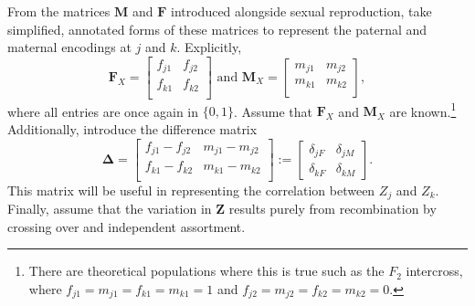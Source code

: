 \documentclass[sts]{imsart}
\newcommand{\ve}[1]{\mathbf{#1}}           %
\newcommand{\m}[1]{\mathbf{#1}}               %
\newcommand{\sm}[1]{\boldsymbol{#1}}   %
\begin{document}
From the matrices $\m{M}$ and $\m{F}$ introduced alongside sexual reproduction, take simplified, annotated forms of these matrices to represent the paternal and maternal encodings at $j$ and $k$. Explicitly,
\begin{equation} \label{eq:parEncs}
  \m{F}_X = \begin{bmatrix}
  f_{j1} & f_{j2} \\
  f_{k1} & f_{k2} \\
\end{bmatrix} \text{ and }
\m{M}_X = \begin{bmatrix}
  m_{j1} & m_{j2} \\
  m_{k1} & m_{k2} \\
\end{bmatrix},
\end{equation}
where all entries are once again in $\{0,1\}$. Assume that $\m{F}_X$ and $\m{M}_X$ are known.\footnote{There are theoretical populations where this is true such as the $F_2$ intercross, where $f_{j1} = m_{j1} = f_{k1} = m_{k1} = 1$ and $f_{j2} = m_{j2} = f_{k2} = m_{k2} = 0$.} Additionally, introduce the difference matrix
\begin{equation} \label{eq:diffMatrix}
  \sm{\Delta} = \begin{bmatrix}
    f_{j1} - f_{j2} & m_{j1} - m_{j2} \\
    f_{k1} - f_{k2} & m_{k1} - m_{k2} \\
  \end{bmatrix} := \begin{bmatrix}
    \delta_{jF} & \delta_{jM} \\
    \delta_{kF} & \delta_{kM}
  \end{bmatrix}.
\end{equation}
This matrix will be useful in representing the correlation between $Z_j$ and $Z_k$.
Finally, assume that the variation in $\ve{Z}$ results purely from recombination by crossing over and independent assortment.
\end{document}
